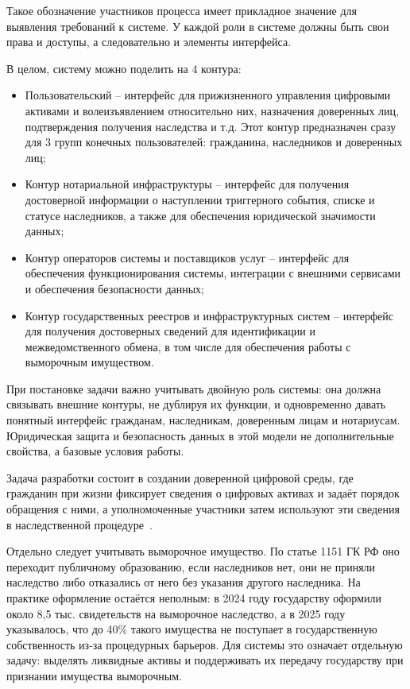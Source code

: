 Такое обозначение участников процесса имеет прикладное значение для выявления требований к системе. У каждой роли в системе должны быть свои права и доступы, а следовательно и элементы интерфейса.

В целом, систему можно поделить на 4 контура:

\begin{itemize}
  \item Пользовательский -- интерфейс для прижизненного управления цифровыми активами и волеизъявлением относительно них, назначения доверенных лиц, подтверждения получения наследства и т.д. Этот контур предназначен сразу для 3 групп конечных пользователей: гражданина, наследников и доверенных лиц;
  \item Контур нотариальной инфраструктуры -- интерфейс для получения достоверной информации о наступлении триггерного события, списке и статусе наследников, а также для обеспечения юридической значимости данных;
  \item Контур операторов системы и поставщиков услуг -- интерфейс для обеспечения функционирования системы, интеграции с внешними сервисами и обеспечения безопасности данных;
  \item Контур государственных реестров и инфраструктурных систем -- интерфейс для получения достоверных сведений для идентификации и межведомственного обмена, в том числе для обеспечения работы с выморочным имуществом.
\end{itemize}

При постановке задачи важно учитывать двойную роль системы: она должна связывать внешние контуры, не дублируя их функции, и одновременно давать понятный интерфейс гражданам, наследникам, доверенным лицам и нотариусам. Юридическая защита и безопасность данных в этой модели не дополнительные свойства, а базовые условия работы.


Задача разработки состоит в создании доверенной цифровой среды, где гражданин при жизни фиксирует сведения о цифровых активах и задаёт порядок обращения с ними, а уполномоченные участники затем используют эти сведения в наследственной процедуре~\cite{Haritonova2024HSE, nist80063_4_2025, iso27001_2022}.

Отдельно следует учитывать выморочное имущество. По статье 1151 ГК РФ оно переходит публичному образованию, если наследников нет, они не приняли наследство либо отказались от него без указания другого наследника. На практике оформление остаётся неполным: в 2024 году государству оформили около 8,5 тыс. свидетельств на выморочное наследство, а в 2025 году указывалось, что до 40\% такого имущества не поступает в государственную собственность из-за процедурных барьеров. Для системы это означает отдельную задачу: выделять ликвидные активы и поддерживать их передачу государству при признании имущества выморочным.

